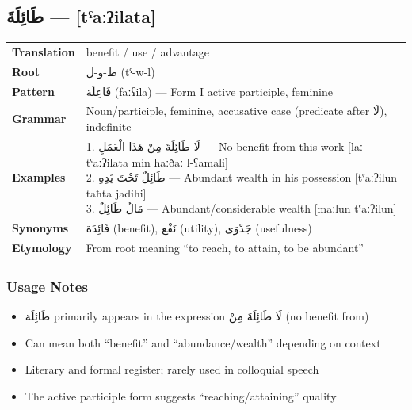 \documentclass[letterpaper,12pt]{article}
\begin{document}
\subsection{\textarabic{طَائِلَةَ} — [tˤaːʔilata]}
\begin{tabular}{p{3cm}p{10cm}}
\toprule
\textbf{Translation} & benefit / use / advantage \\
\textbf{Root} & \textarabic{ط-و-ل} (tˤ-w-l) \\
\textbf{Pattern} & \textarabic{فَاعِلَة} (faːʕila) — Form I active participle, feminine \\
\textbf{Grammar} & Noun/participle, feminine, accusative case (predicate after \textarabic{لَا}), indefinite \\
\midrule
\textbf{Examples} & \makecell[l]{\parbox{9.5cm}{
1. \textarabic{لَا طَائِلَةَ مِنْ هَذَا الْعَمَلِ} — No benefit from this work [laː tˤaːʔilata min haːðaː l-ʕamali]\\
2. \textarabic{طَائِلٌ تَحْتَ يَدِهِ} — Abundant wealth in his possession [tˤaːʔilun taħta jadihi]\\
3. \textarabic{مَالٌ طَائِلٌ} — Abundant/considerable wealth [maːlun tˤaːʔilun]
}} \\
\midrule
\textbf{Synonyms} & \textarabic{فَائِدَة} (benefit), \textarabic{نَفْع} (utility), \textarabic{جَدْوَى} (usefulness) \\
\textbf{Etymology} & From root meaning ``to reach, to attain, to be abundant'' \\
\bottomrule
\end{tabular}

\subsubsection*{Usage Notes}
\begin{itemize}
\item \textarabic{طَائِلَة} primarily appears in the expression \textarabic{لَا طَائِلَةَ مِنْ} (no benefit from)
\item Can mean both ``benefit'' and ``abundance/wealth'' depending on context
\item Literary and formal register; rarely used in colloquial speech
\item The active participle form suggests ``reaching/attaining'' quality
\end{itemize}
\end{document}
